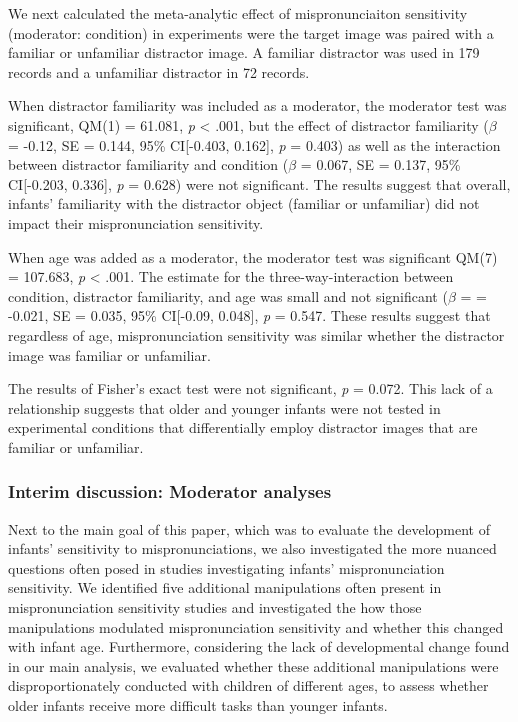 \documentclass[man]{apa6}
\begin{document}
We next calculated the meta-analytic effect of mispronunciaiton sensitivity (moderator: condition) in experiments were the target image was paired with a familiar or unfamiliar distractor image. A familiar distractor was used in 179 records and a unfamiliar distractor in 72 records.

When distractor familiarity was included as a moderator, the moderator test was significant, QM(1) = 61.081, \emph{p} \textless{} .001, but the effect of distractor familiarity (\(\beta\) = -0.12, SE = 0.144, 95\% CI{[}-0.403, 0.162{]}, \emph{p} = 0.403) as well as the interaction between distractor familiarity and condition (\(\beta\) = 0.067, SE = 0.137, 95\% CI{[}-0.203, 0.336{]}, \emph{p} = 0.628) were not significant. The results suggest that overall, infants' familiarity with the distractor object (familiar or unfamiliar) did not impact their mispronunciation sensitivity.

When age was added as a moderator, the moderator test was significant QM(7) = 107.683, \emph{p} \textless{} .001. The estimate for the three-way-interaction between condition, distractor familiarity, and age was small and not significant (\(\beta\) = = -0.021, SE = 0.035, 95\% CI{[}-0.09, 0.048{]}, \emph{p} = 0.547. These results suggest that regardless of age, mispronunciation sensitivity was similar whether the distractor image was familiar or unfamiliar.

The results of Fisher's exact test were not significant, \emph{p} = 0.072. This lack of a relationship suggests that older and younger infants were not tested in experimental conditions that differentially employ distractor images that are familiar or unfamiliar.

\hypertarget{interim-discussion-moderator-analyses}{%
\subsubsection{Interim discussion: Moderator analyses}\label{interim-discussion-moderator-analyses}}

Next to the main goal of this paper, which was to evaluate the development of infants' sensitivity to mispronunciations, we also investigated the more nuanced questions often posed in studies investigating infants' mispronunciation sensitivity. We identified five additional manipulations often present in mispronunciation sensitivity studies and investigated the how those manipulations modulated mispronunciation sensitivity and whether this changed with infant age. Furthermore, considering the lack of developmental change found in our main analysis, we evaluated whether these additional manipulations were disproportionately conducted with children of different ages, to assess whether older infants receive more difficult tasks than younger infants.
\end{document}
